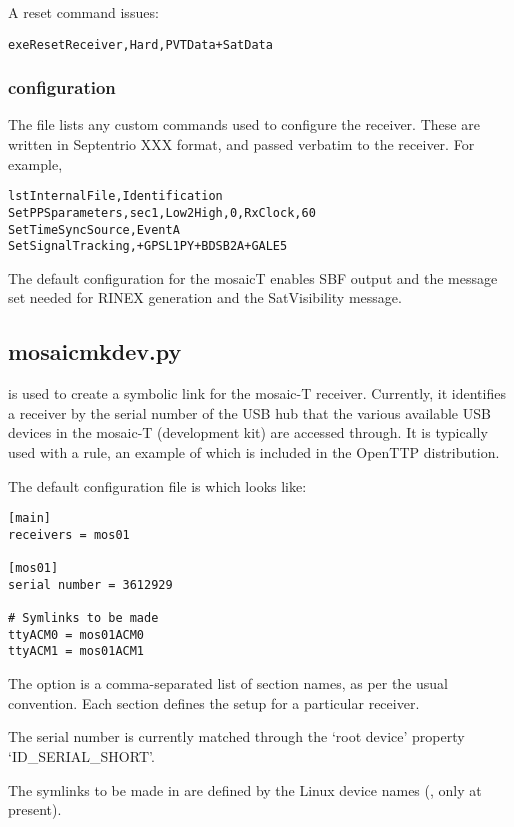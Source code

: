 A reset command issues:
\begin{lstlisting}
exeResetReceiver,Hard,PVTData+SatData
\end{lstlisting}

\subsubsection{configuration}

The file  lists any custom commands used to configure the receiver.
These are written in Septentrio XXX format, and passed verbatim to the receiver.
For example,
\begin{lstlisting}
lstInternalFile,Identification
SetPPSparameters,sec1,Low2High,0,RxClock,60
SetTimeSyncSource,EventA
SetSignalTracking,+GPSL1PY+BDSB2A+GALE5
\end{lstlisting}

The default configuration for the mosaicT enables SBF output and the message set needed for RINEX generation and the SatVisibility message.

\subsection{mosaicmkdev.py}

 is used to create a symbolic link for the mosaic-T receiver.
Currently, it identifies a receiver by the serial number of the USB hub
that the various available USB devices in the mosaic-T (development kit) are accessed through.
It is typically used with a  rule, an example of which is included in the OpenTTP distribution.

The default configuration file is  which looks like:
\begin{lstlisting}
[main]
receivers = mos01

[mos01]
serial number = 3612929

# Symlinks to be made
ttyACM0 = mos01ACM0
ttyACM1 = mos01ACM1
\end{lstlisting}

The  option is a comma-separated list of section names, as per the usual convention.
Each section defines the setup for a particular receiver.

The serial number is currently matched through the  `root device' property `ID\_SERIAL\_SHORT'.

The symlinks to be made in  are defined by the Linux device names (,  only at present).

